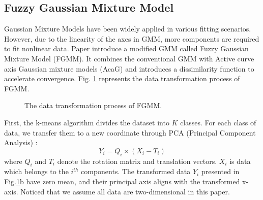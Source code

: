 \documentclass[conference]{IEEEtran}
\begin{document}
\subsection{Fuzzy Gaussian Mixture Model}
Gaussian Mixture Models have been widely applied in various fitting scenarios. However, due to the linearity of the axes in GMM, more components are required to fit nonlinear data. Paper \cite{Ju2012} introduce a modified GMM called Fuzzy Gaussian Mixture Model (FGMM). It combines the conventional GMM with Active curve axis Gaussian mixture models (AcaG)\cite{Zhang2005} and introduces a dissimilarity function to accelerate convergence. Fig. \ref{fig2} represents the data transformation process of FGMM.
\begin{figure}[!t]
    \centering
    \quad
    \caption{The data transformation process of FGMM.}
    \label{fig2}
\end{figure}

First, the k-means algorithm divides the dataset into $K$ classes. For each class of data, we transfer them to a new coordinate through PCA (Principal Component Analysis) :
\begin{equation}
    Y_i=Q_i \times (X_i-T_i)
\end{equation}
where $Q_i$ and $T_i$ denote the rotation matrix and translation vectors. $X_i$ is data which belongs to the $i^{th}$ components. The transformed data $Y_i$ presented in Fig.\ref{fig2}b have zero mean, and their principal axis aligns with the transformed x-axis. Noticed that we assume all data are two-dimensional in this paper.
\end{document}
